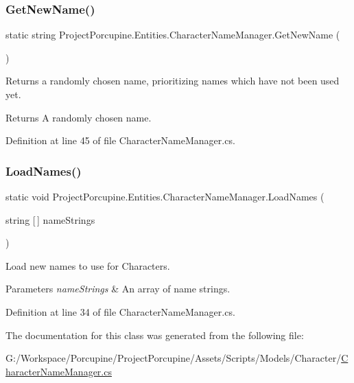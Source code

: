 \subsubsection{\texorpdfstring{Get\+New\+Name()}{GetNewName()}}
{\footnotesize\ttfamily static string Project\+Porcupine.\+Entities.\+Character\+Name\+Manager.\+Get\+New\+Name (\begin{DoxyParamCaption}{ }\end{DoxyParamCaption})\hspace{0.3cm}{\ttfamily [static]}}



Returns a randomly chosen name, prioritizing names which have not been used yet. 

\begin{DoxyReturn}{Returns}
A randomly chosen name.
\end{DoxyReturn}


Definition at line 45 of file Character\+Name\+Manager.\+cs.

\mbox{\label{class_project_porcupine_1_1_entities_1_1_character_name_manager_aaa230ecfbd820bd719090425d5c67a97}} 
\subsubsection{\texorpdfstring{Load\+Names()}{LoadNames()}}
{\footnotesize\ttfamily static void Project\+Porcupine.\+Entities.\+Character\+Name\+Manager.\+Load\+Names (\begin{DoxyParamCaption}\item[{string \mbox{[}$\,$\mbox{]}}]{name\+Strings }\end{DoxyParamCaption})\hspace{0.3cm}{\ttfamily [static]}}



Load new names to use for Characters. 


\begin{DoxyParams}{Parameters}
{\em name\+Strings} & An array of name strings.\\
\hline
\end{DoxyParams}


Definition at line 34 of file Character\+Name\+Manager.\+cs.



The documentation for this class was generated from the following file\+:\begin{DoxyCompactItemize}
\item 
G\+:/\+Workspace/\+Porcupine/\+Project\+Porcupine/\+Assets/\+Scripts/\+Models/\+Character/\hyperlink{_character_name_manager_8cs}{Character\+Name\+Manager.\+cs}\end{DoxyCompactItemize}
